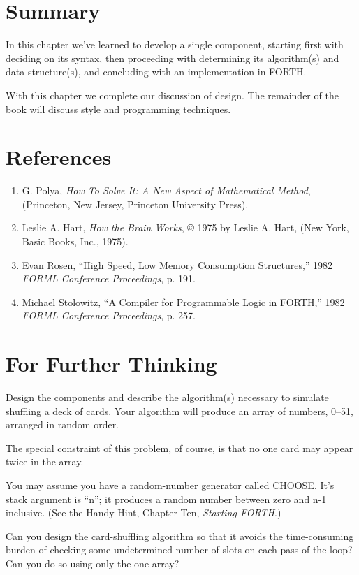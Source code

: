 \section{Summary}

In this chapter we've learned to develop a single component, starting
first with deciding on its syntax, then proceeding with determining its
algorithm(s) and data structure(s), and concluding with an implementation
in FORTH.

With this chapter we complete our discussion of design. The remainder
of the book will discuss style and programming techniques.

\section{References}

\begin{enumerate}
\item G. Polya, \emph{How To Solve It: A New Aspect of Mathematical Method},
   (Princeton, New Jersey, Princeton University Press).
\item Leslie A. Hart, \emph{How the Brain Works}, \copyright{} 1975 by Leslie A. Hart,
   (New York, Basic Books, Inc., 1975).
\item Evan Rosen, ``High Speed, Low Memory Consumption Structures,'' 1982
   \emph{FORML Conference Proceedings}, p. 191.
\item Michael Stolowitz, ``A Compiler for Programmable Logic in FORTH,'' 1982
   \emph{FORML Conference Proceedings}, p. 257.
\end{enumerate}

\section{For Further Thinking}

Design the components and describe the algorithm(s) necessary to simulate
shuffling a deck of cards. Your algorithm will produce an array of
numbers, 0--51, arranged in random order.

The special constraint of this problem, of course, is that no one card
may appear twice in the array.

You may assume you have a random-number generator called
CHOOSE. It's stack argument is ``n''; it produces a random number
between zero and n-1 inclusive. (See the Handy Hint, Chapter Ten,
\emph{Starting FORTH}.)

Can you design the card-shuffling algorithm so that it avoids the
time-consuming burden of checking some undetermined number of slots
on each pass of the loop? Can you do so using only the one array?
